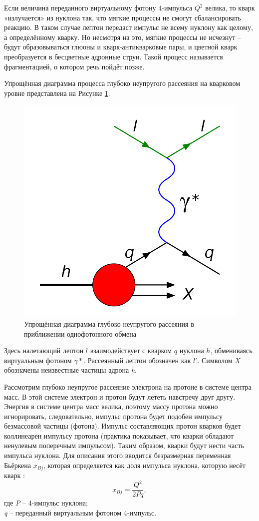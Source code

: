 \documentclass{extreport}
\begin{document}
Если величина переданного виртуальному фотону 4-импульса $Q^2$ велика, то кварк «излучается» из нуклона так, что мягкие процессы не смогут сбалансировать реакцию. В таком случае лептон передаст импульс не всему нуклону как целому, а определённому кварку. Но несмотря на это, мягкие процессы не исчезнут – будут образовываться глюоны и кварк-антикварковые пары, и цветной кварк преобразуется в бесцветные адронные струи. Такой процесс называется фрагментацией, о котором речь пойдёт позже.

Упрощённая диаграмма процесса глубоко неупругого рассеяния на кварковом уровне представлена на Рисунке \ref{fig:DIS}.


\begin{figure}[h]
    \centering
    \includegraphics[width = 0.7\linewidth]{DIS.png}
    \caption{Упрощённая диаграмма глубоко неупругого рассеяния в приближении однофотонного обмена}
    \label{fig:DIS}
\end{figure}

Здесь налетающий лептон $l$ взаимодействует с кварком $q$ нуклона $h$, обмениваясь виртуальным фотоном $\gamma*$. Рассеянный лептон обозначен как $l'$. Символом $X$ обозначены неизвестные частицы адрона \textit{h}.

Рассмотрим глубоко неупругое рассеяние электрона на протоне в системе центра масс. В этой системе электрон и протон будут лететь навстречу друг другу. Энергия в системе центра масс велика, поэтому массу протона можно игнорировать, следовательно, импульс протона будет подобен импульсу безмассовой частицы (фотона). Импульс составляющих протон кварков будет коллинеарен импульсу протона (практика показывает, что кварки обладают ненулевым поперечным импульсом). Таким образом, кварки будут нести часть импульса нуклона. Для описания этого вводится безразмерная переменная Бьёркена $x_{Bj}$, которая определяется как доля импульса нуклона, которую несёт кварк \cite{Metz_2016}:
\begin{equation}
    x_{Bj}= \frac{Q^2}{2Pq},
\end{equation}
где \textit{P} -- 4-импульс нуклона; \\ \textit{q} -- переданный виртуальным фотоном 4-импульс. 
\end{document}
